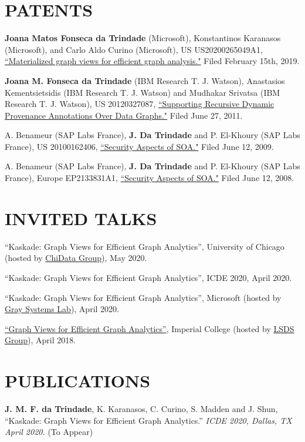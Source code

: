 \documentclass[line,margin]{res}
\begin{document}
\begin{resume}
\section{PATENTS}
\textbf{Joana Matos Fonseca da Trindade} (Microsoft), Konstantinos Karanasos (Microsoft), and Carlo Aldo Curino (Microsoft), US US20200265049A1, \href{https://patents.google.com/patent/US20200265049A1/en}{``Materialized graph views for efficient graph analysis."} Filed February 15th, 2019.

\textbf{Joana M. Fonseca da Trindade} (IBM Research T. J. Watson), Anastasios Kementsietsidis (IBM Research T. J. Watson) and Mudhakar Srivatsa (IBM Research T. J. Watson), US 20120327087, \href{http://www.faqs.org/patents/app/20120327087}{``Supporting Recursive Dynamic Provenance Annotations Over Data Graphs."} Filed June 27, 2011.

A. Benameur (SAP Labs France), \textbf{J. Da Trindade} and P. El-Khoury (SAP Labs France), US 20100162406, \href{http://www.faqs.org/patents/app/20100162406}{``Security Aspects of SOA."}  Filed June 12, 2009.

A. Benameur (SAP Labs France), \textbf{J. Da Trindade} and P. El-Khoury (SAP Labs France), Europe EP2133831A1, \href{http://www.freepatentsonline.com/EP2133831B1.html}{``Security Aspects of SOA."}  Filed June 12, 2008.


\section{INVITED TALKS}
``Kaskade: Graph Views for Efficient Graph Analytics'', University of Chicago (hosted by \href{https://data.cs.uchicago.edu/}{ChiData Group}), May 2020.

``Kaskade: Graph Views for Efficient Graph Analytics'', ICDE 2020, April 2020.

``Kaskade: Graph Views for Efficient Graph Analytics'', Microsoft (hosted by \href{https://azuredata.microsoft.com}{Gray Systems Lab}), April 2020.

\href{http://lsds.doc.ic.ac.uk/content/graph-views-efficient-graph-analytics-collaboration-microsoft-cisl}{``Graph Views for Efficient Graph Analytics''}, Imperial College (hosted by \href{https://lsds.doi.ic.ac.uk}{LSDS Group}), April 2018.


\section{PUBLICATIONS}
\textbf{J. M. F. da Trindade}, K. Karanasos, C. Curino, S. Madden and J. Shun, ``Kaskade: Graph Views for Efficient Graph Analytics.'' \textit{ICDE 2020, Dallas, TX April 2020.} (To Appear)


\end{resume}
\end{document}
